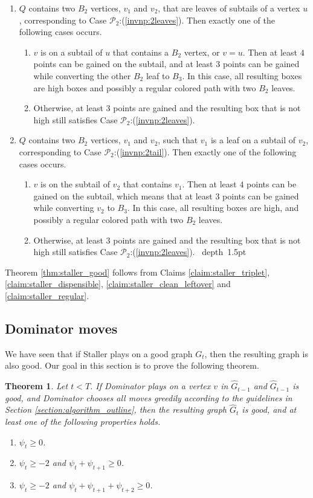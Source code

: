 \documentclass[11pt]{article}
\def\blackslug{\hbox{\hskip 1pt \vrule width 4pt height 8pt
    depth 1.5pt \hskip 1pt}}
\def\QED{\quad\blackslug\lower 8.5pt\null\par}
\def\dnsitem{\vspace{-7pt}\item}
\newtheorem{theorem}{Theorem}[section]
\theoremstyle{definition}
\def\propbbr{\mathcal{P}_2}
\begin{document}
\begin{enumerate}
		\dnsitem $Q$ contains two $B_2$ vertices, $v_1$ and $v_2$, that are leaves of subtails of a vertex $u$, corresponding to Case $\propbbr$:(\ref{invnp:2leaves}).
		Then exactly one of the following cases occurs.
		\begin{enumerate}
			\dnsitem $v$ is on a subtail of $u$ that contains a $B_2$ vertex, or $v = u$. Then at least $4$ points can be gained on the subtail, 
			and at least $3$ points can be gained while converting the other $B_2$ leaf to $B_3$.
			In this case, all resulting boxes are high boxes and possibly a regular colored path with two $B_2$ leaves.
			\dnsitem Otherwise, at least $3$ points are gained and the resulting box that is not high still satisfies Case $\propbbr$:(\ref{invnp:2leaves}).
		\end{enumerate}
		
		\dnsitem $Q$ contains two $B_2$ vertices, $v_1$ and $v_2$, such that $v_1$ is a leaf on a subtail of $v_2$, corresponding to Case $\propbbr$:(\ref{invnp:2tail}).
		Then exactly one of the following cases occurs.
		\begin{enumerate}
			\dnsitem $v$ is on the subtail of $v_2$ that contains $v_1$. Then at least $4$ points can be gained on the subtail, 
			which means that at least $3$ points can be gained while converting $v_2$ to $B_3$.
			In this case, all resulting boxes are high, and possibly a regular colored path with two $B_2$ leaves.
			\dnsitem Otherwise, at least $3$ points are gained and the resulting box that is not high still satisfies Case $\propbbr$:(\ref{invnp:2leaves}).
\QED
		\end{enumerate}
	\end{enumerate}

Theorem \ref{thm:staller_good} follows from Claims \ref{claim:staller_triplet}, \ref{claim:staller_dispensible}, \ref{claim:staller_clean_leftover} and \ref{claim:staller_regular}.

\subsection{Dominator moves}
\label{sub:an_dom}

We have seen that if Staller plays on a good graph $G_t$, 
then the resulting graph is also good.
Our goal in this section is to prove the following theorem.

\begin{theorem}
\label{thm:dom_gain}
Let $t < T$.
If Dominator plays on a vertex $v$ in $\hat{G}_{t-1}$ and $\hat{G}_{t-1}$ is good, and Dominator chooses all moves greedily according to the guidelines in Section \ref{section:algorithm_outline},
then the resulting graph $\hat{G}_t$ is good, and at least one of the following properties holds.
\begin{enumerate}
	\dnsitem $\psi_t \geq 0$.
	\dnsitem $\psi_t \geq -2$ and $\psi_t + \psi_{t+1} \geq 0$.
	\dnsitem $\psi_t \geq -2$ and $\psi_t + \psi_{t + 1} + \psi_{t + 2} \geq 0$.
\end{enumerate}
\end{theorem}
\end{document}
